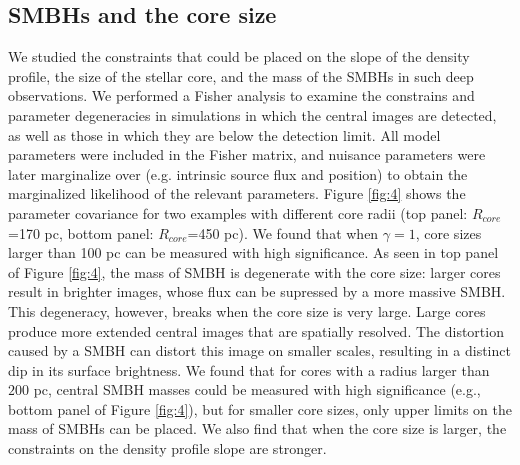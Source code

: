\documentclass[chicago]{emulateapj}
\begin{document}
\subsection{SMBHs and the core size}
We studied the constraints that could be placed on the slope of the density profile, the size of the stellar core, and the mass of the SMBHs in such deep observations. 
We performed a Fisher analysis to examine the constrains and parameter degeneracies in simulations in which the central images are detected, as well as those in which they are below the detection limit. All model parameters were included in the Fisher matrix, and nuisance parameters were later marginalize over (e.g. intrinsic source flux and position) to obtain the marginalized likelihood of the relevant parameters.  
 Figure \ref{fig:4} shows the parameter covariance for two examples with different core radii (top panel:  $R_{core}$=170 pc, bottom panel: $R_{core}$=450 pc).
We found that when $\gamma=1$, core sizes larger than 100 pc can be measured with high significance. As seen in top panel of Figure \ref{fig:4}, 
the mass of SMBH is degenerate with the core size: larger cores result in brighter images, whose flux can be supressed by a more massive SMBH.
This degeneracy,  however,  breaks when the core size is very large. 
Large cores produce more extended central images that are spatially resolved. The distortion caused by a SMBH can distort this image on smaller scales, resulting in a distinct dip in its surface brightness. %
We found that for cores with a radius larger than $200$ pc, central SMBH masses could be measured with high significance (e.g., bottom panel of Figure \ref{fig:4}), but for smaller core sizes, only upper limits on the mass of SMBHs can be placed.
We also find that when the core size is larger, the constraints on the density profile slope are stronger.

\end{document}
